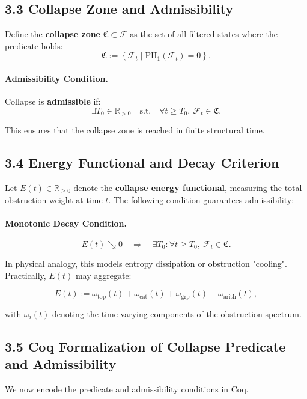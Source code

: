 \documentclass[11pt]{article}
\begin{document}
\subsection*{3.3 Collapse Zone and Admissibility}

Define the \textbf{collapse zone} \( \mathfrak{C} \subset \mathcal{F} \) as the set of all filtered states where the predicate holds:
\[
\mathfrak{C} := \left\{ \mathcal{F}_t \mid \mathrm{PH}_1(\mathcal{F}_t) = 0 \right\}.
\]

\paragraph{Admissibility Condition.}  
Collapse is \textbf{admissible} if:
\[
\exists T_0 \in \mathbb{R}_{>0} \quad \text{s.t.} \quad \forall t \geq T_0, \ \mathcal{F}_t \in \mathfrak{C}.
\]

This ensures that the collapse zone is reached in finite structural time.

\subsection*{3.4 Energy Functional and Decay Criterion}

Let \( E(t) \in \mathbb{R}_{\geq 0} \) denote the \textbf{collapse energy functional}, measuring the total obstruction weight at time \( t \). The following condition guarantees admissibility:

\paragraph{Monotonic Decay Condition.}
\[
E(t) \searrow 0 \quad \Rightarrow \quad \exists T_0 : \forall t \geq T_0,\ \mathcal{F}_t \in \mathfrak{C}.
\]

In physical analogy, this models entropy dissipation or obstruction "cooling". Practically, \( E(t) \) may aggregate:

\[
E(t) := \omega_{\mathrm{top}}(t) + \omega_{\mathrm{cat}}(t) + \omega_{\mathrm{grp}}(t) + \omega_{\mathrm{arith}}(t),
\]

with \( \omega_i(t) \) denoting the time-varying components of the obstruction spectrum.

\subsection*{3.5 Coq Formalization of Collapse Predicate and Admissibility}

We now encode the predicate and admissibility conditions in Coq.
\end{document}
